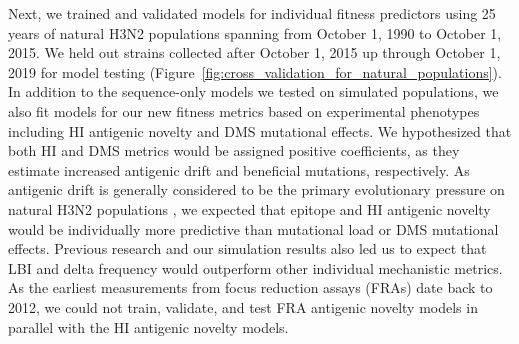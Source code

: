 Next, we trained and validated models for individual fitness predictors using 25 years of natural H3N2 populations spanning from October 1, 1990 to October 1, 2015.
We held out strains collected after October 1, 2015 up through October 1, 2019 for model testing (Figure~\ref{fig:cross_validation_for_natural_populations}).
In addition to the sequence-only models we tested on simulated populations, we also fit models for our new fitness metrics based on experimental phenotypes including HI antigenic novelty and DMS mutational effects.
We hypothesized that both HI and DMS metrics would be assigned positive coefficients, as they estimate increased antigenic drift and beneficial mutations, respectively.
As antigenic drift is generally considered to be the primary evolutionary pressure on natural H3N2 populations \citep{Smith:2004jc,Bedford:2014bf,Luksza:2014hj}, we expected that epitope and HI antigenic novelty would be individually more predictive than mutational load or DMS mutational effects.
Previous research \citep{Neher:2014eu} and our simulation results also led us to expect that LBI and delta frequency would outperform other individual mechanistic metrics.
As the earliest measurements from focus reduction assays (FRAs) date back to 2012, we could not train, validate, and test FRA antigenic novelty models in parallel with the HI antigenic novelty models.

